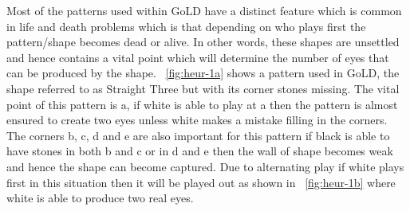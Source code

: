 \documentclass{l4proj}
\begin{document}
Most of the patterns used within GoLD have a distinct feature which is common in life and death problems which is that depending on who plays first the pattern/shape becomes dead or alive. In other words, these shapes are unsettled and hence contains a vital point which will determine the number of eyes that can be produced by the shape. ~\autoref{fig:heur-1a} shows a pattern used in GoLD, the shape referred to as Straight Three but with its corner stones missing. The vital point of this pattern is a, if white is able to play at a then the pattern is almost ensured to create two eyes unless white makes a mistake filling in the corners. The corners b, c, d and e are also important for this pattern if black is able to have stones in both b and c  or in d and e then the wall of shape becomes weak and hence the shape can become captured. Due to alternating play if white plays first in this situation then it will be played out as shown in ~\autoref{fig:heur-1b} where white is able to produce two real eyes.


\end{document}
